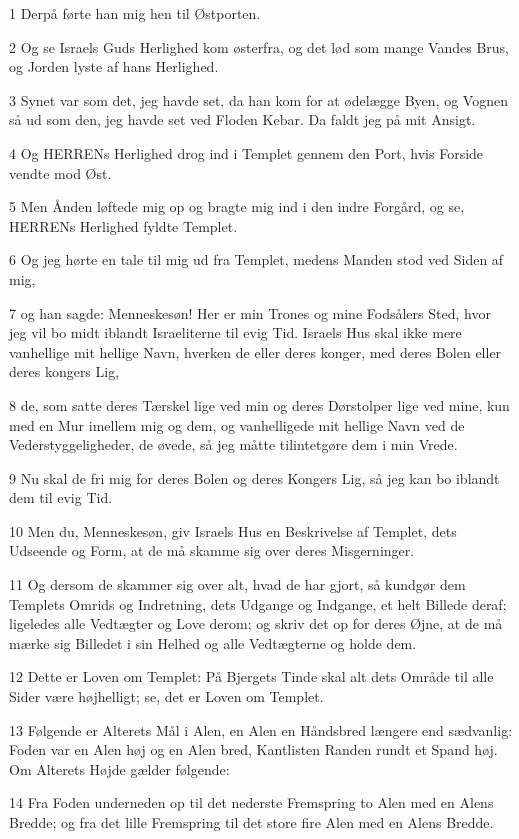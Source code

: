 \par 1 Derpå førte han mig hen til Østporten.
\par 2 Og se Israels Guds Herlighed kom østerfra, og det lød som mange Vandes Brus, og Jorden lyste af hans Herlighed.
\par 3 Synet var som det, jeg havde set, da han kom for at ødelægge Byen, og Vognen så ud som den, jeg havde set ved Floden Kebar. Da faldt jeg på mit Ansigt.
\par 4 Og HERRENs Herlighed drog ind i Templet gennem den Port, hvis Forside vendte mod Øst.
\par 5 Men Ånden løftede mig op og bragte mig ind i den indre Forgård, og se, HERRENs Herlighed fyldte Templet.
\par 6 Og jeg hørte en tale til mig ud fra Templet, medens Manden stod ved Siden af mig,
\par 7 og han sagde: Menneskesøn! Her er min Trones og mine Fodsålers Sted, hvor jeg vil bo midt iblandt Israeliterne til evig Tid. Israels Hus skal ikke mere vanhellige mit hellige Navn, hverken de eller deres konger, med deres Bolen eller deres kongers Lig,
\par 8 de, som satte deres Tærskel lige ved min og deres Dørstolper lige ved mine, kun med en Mur imellem mig og dem, og vanhelligede mit hellige Navn ved de Vederstyggeligheder, de øvede, så jeg måtte tilintetgøre dem i min Vrede.
\par 9 Nu skal de fri mig for deres Bolen og deres Kongers Lig, så jeg kan bo iblandt dem til evig Tid.
\par 10 Men du, Menneskesøn, giv Israels Hus en Beskrivelse af Templet, dets Udseende og Form, at de må skamme sig over deres Misgerninger.
\par 11 Og dersom de skammer sig over alt, hvad de har gjort, så kundgør dem Templets Omrids og Indretning, dets Udgange og Indgange, et helt Billede deraf; ligeledes alle Vedtægter og Love derom; og skriv det op for deres Øjne, at de må mærke sig Billedet i sin Helhed og alle Vedtægterne og holde dem.
\par 12 Dette er Loven om Templet: På Bjergets Tinde skal alt dets Område til alle Sider være højhelligt; se, det er Loven om Templet.
\par 13 Følgende er Alterets Mål i Alen, en Alen en Håndsbred længere end sædvanlig: Foden var en Alen høj og en Alen bred, Kantlisten Randen rundt et Spand høj. Om Alterets Højde gælder følgende:
\par 14 Fra Foden underneden op til det nederste Fremspring to Alen med en Alens Bredde; og fra det lille Fremspring til det store fire Alen med en Alens Bredde.
